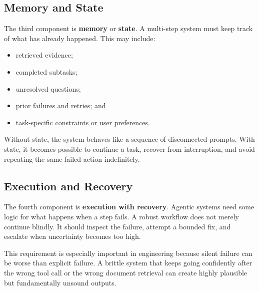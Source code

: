 \documentclass[12pt]{article}
\begin{document}
\subsection{Memory and State}

The third component is \textbf{memory} or \textbf{state}. A multi-step system must keep track of what has already happened. This may include:
\begin{itemize}
    \item retrieved evidence;
    \item completed subtasks;
    \item unresolved questions;
    \item prior failures and retries; and
    \item task-specific constraints or user preferences.
\end{itemize}

Without state, the system behaves like a sequence of disconnected prompts. With state, it becomes possible to continue a task, recover from interruption, and avoid repeating the same failed action indefinitely.

\subsection{Execution and Recovery}

The fourth component is \textbf{execution with recovery}. Agentic systems need some logic for what happens when a step fails. A robust workflow does not merely continue blindly. It should inspect the failure, attempt a bounded fix, and escalate when uncertainty becomes too high.

This requirement is especially important in engineering because silent failure can be worse than explicit failure. A brittle system that keeps going confidently after the wrong tool call or the wrong document retrieval can create highly plausible but fundamentally unsound outputs.
\end{document}

